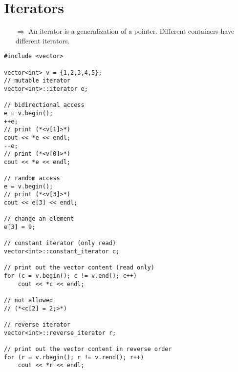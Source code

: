 \documentclass[10pt]{article}
\begin{document}
\section{Iterators}
\small
\begin{enumerate}
\item[$\Rightarrow$] An iterator is a generalization of a pointer. Different containers have
different iterators.
\end{enumerate}
\begin{lstlisting}
#include <vector>

vector<int> v = {1,2,3,4,5};
// mutable iterator
vector<int>::iterator e;

// bidirectional access
e = v.begin();
++e;
// print (*<v[1]>*)
cout << *e << endl;
--e;
// print (*<v[0]>*)
cout << *e << endl;

// random access
e = v.begin();
// print (*<v[3]>*)
cout << e[3] << endl;

// change an element
e[3] = 9;

// constant iterator (only read)
vector<int>::constant_iterator c;

// print out the vector content (read only)   
for (c = v.begin(); c != v.end(); c++)
    cout << *c << endl;

// not allowed
// (*<c[2] = 2;>*)

// reverse iterator
vector<int>::reverse_iterator r;

// print out the vector content in reverse order
for (r = v.rbegin(); r != v.rend(); r++)
    cout << *r << endl;
\end{lstlisting}
%
%
\end{document}
